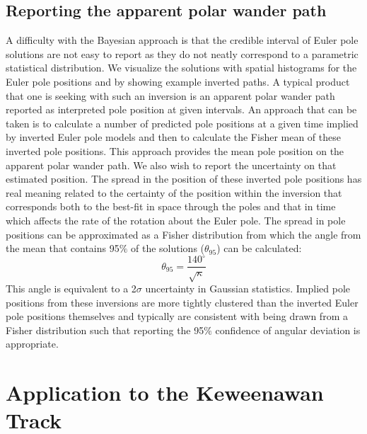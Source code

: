 \documentclass[11pt,letterpaper]{article}
\begin{document}
\subsection*{Reporting the apparent polar wander path}
\label{sec:age_uncertainty}
A difficulty with the Bayesian approach is that the credible interval of Euler pole solutions are not easy to report as they do not neatly correspond to a parametric statistical distribution. We visualize the solutions with spatial histograms for the Euler pole positions and by showing example inverted paths. A typical product that one is seeking with such an inversion is an apparent polar wander path reported as interpreted pole position at given intervals. An approach that can be taken is to calculate a number of predicted pole positions at a given time implied by inverted Euler pole models and then to calculate the Fisher mean of these inverted pole positions. This approach provides the mean pole position on the apparent polar wander path. We also wish to report the uncertainty on that estimated position. The spread in the position of these inverted pole positions has real meaning related to the certainty of the position within the inversion that corresponds both to the best-fit in space through the poles and that in time which affects the rate of the rotation about the Euler pole. The spread in pole positions can be approximated as a Fisher distribution from which the angle from the mean that contains 95$\%$ of the solutions ($\theta_{95}$) can be calculated:
\begin{equation}
\theta_{95}=\frac{140^{\circ}}{\sqrt{\kappa}}
\label{eq:angular_deviation}
\end{equation}
This angle is equivalent to a 2$\sigma$ uncertainty in Gaussian statistics. Implied pole positions from these inversions are more tightly clustered than the inverted Euler pole positions themselves and typically are consistent with being drawn from a Fisher distribution such that reporting the 95$\%$ confidence of angular deviation is appropriate.

\section*{Application to the Keweenawan Track}
\label{sec:keweenawan}
\end{document}
